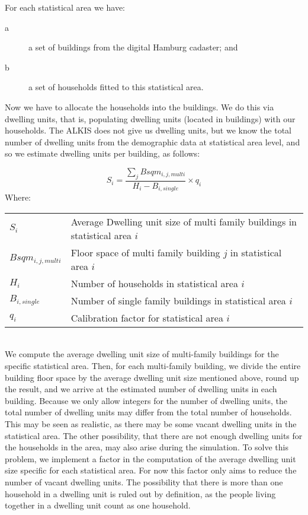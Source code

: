 \documentclass[11pt]{IJM-article}
\begin{document}
For each statistical area we have:
\begin{description}
    \item[a] a set of buildings from the digital Hamburg cadaster; and
    \item[b] a set of households fitted to this statistical area.
\end{description}

Now we have to allocate the households into the buildings. We do this via
dwelling units, that is, populating dwelling units (located in buildings) with
our households. The ALKIS does not give us dwelling units, but we know the
total number of dwelling units from the demographic data at statistical area
level, and so we estimate dwelling units per building, as follows:

\parbox{\textwidth}{ 
    \begin{equation} 
    \label{eq:4} 
        S_{i} = \frac{\sum_{j}Bsqm_{i,j,multi}}{H_{i} - B_{i,single}} 
            \times q_{i}
    \end{equation} 
    \noindent Where:\\ 
    \vspace{.5cm}
    \begin{tabular}{l l} 
        $S_{i}$ & Average Dwelling unit size of multi family buildings in 
            statistical area $i$\\ 
        $Bsqm_{i,j,multi}$ & Floor space of multi family building ${j}$ in 
            statistical area $i$\\ 
        $H_{i}$ & Number of households in statistical area ${i}$\\ 
        $B_{i,single}$ & Number of single family buildings in statistical 
            area $i$\\ 
        $q_i$ & Calibration factor for statistical area $i$
    \end{tabular} 
}\\

We compute the average dwelling unit size of multi-family buildings for the
specific statistical area. Then, for each multi-family building, we divide the
entire building floor space by the average dwelling unit size mentioned above,
round up the result, and we arrive at the estimated number of dwelling units in
each building. Because we only allow integers for the number of dwelling units,
the total number of dwelling units may differ from the total number of
households. This may be seen as realistic, as there may be some vacant dwelling
units in the statistical area. The other possibility, that there are not enough
dwelling units for the households in the area, may also arise during the
simulation. To solve this problem, we implement a factor in the computation of
the average dwelling unit size specific for each statistical area. For now this
factor only aims to reduce the number of vacant dwelling units. The possibility
that there is more than one household in a dwelling unit is ruled out by
definition, as the people living together in a dwelling unit count as one
household.
\end{document}
